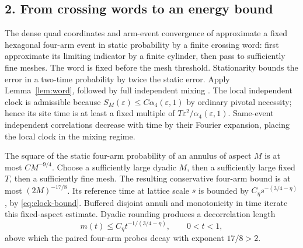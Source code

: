 \documentclass[11pt]{article}
\begin{document}
\subsection*{2. From crossing words to an energy bound}

The dense quad coordinates and arm-event convergence of
\cite[Definition 2.1, Lemma 2.9 and Corollary 2.10]{GPSpivotal}
approximate a fixed hexagonal four-arm event in static probability
by a finite crossing word: first approximate its limiting indicator by
a finite cylinder, then pass to sufficiently fine meshes. The word is
fixed before the mesh threshold. Stationarity bounds the error in a
two-time probability by twice the static error. Apply
Lemma~\ref{lem:word}, followed by full independent mixing
\cite[Theorems 1.3(i), 1.4(i) and Remark 1.5, $\gamma=0$]{GHSS}.
The local independent clock is admissible because
$S_M(\varepsilon)\leq C\alpha_4(\varepsilon,1)$ by ordinary pivotal
necessity; hence its site time is at least a fixed multiple of
$T\varepsilon^2/\alpha_4(\varepsilon,1)$. Same-event independent
correlations decrease with time by their Fourier expansion, placing
the local clock in the mixing regime.

The square of the static four-arm probability of an annulus of aspect
$M$ is at most $CM^{-9/4}$. Choose a sufficiently large dyadic $M$,
then a sufficiently large fixed $T$, then a sufficiently fine mesh.
The resulting conservative four-arm bound is at most
$(2M)^{-17/8}$. Its reference time at lattice scale $s$ is bounded by
$C_\eta s^{-(3/4-\eta)}$, by \eqref{eq:clock-bound}. Buffered disjoint
annuli and monotonicity in time iterate this fixed-aspect estimate.
Dyadic rounding produces a decorrelation length
\begin{equation}\label{eq:scale}
       m(t)\leq C_\eta t^{-1/(3/4-\eta)},\qquad 0<t<1,
\end{equation}
above which the paired four-arm probes decay with exponent $17/8>2$.
\end{document}
